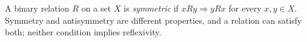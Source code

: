 
A binary relation $R$ on a set $X$ is \emph{symmetric} if $xRy\Rightarrow yRx$ for every $x,y\in X$. Symmetry and antisymmetry are different properties, and a relation can satisfy both; neither condition implies reflexivity.
